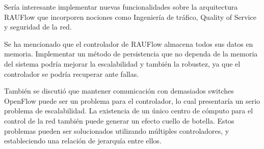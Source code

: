 Sería interesante implementar nuevas funcionalidades sobre la arquitectura RAUFlow que incorporen nociones como Ingeniería de tráfico, Quality of Service y seguridad de la red.

Se ha mencionado que el controlador de RAUFlow almacena todos sus datos en memoria. Implementar un método de persistencia que no dependa de la memoria del sistema podría mejorar la escalabilidad y también la robustez, ya que el controlador se podría recuperar ante fallas.

También se discutió que mantener comunicación con demasiados switches OpenFlow puede ser un problema para el controlador, lo cual presentaría un serio problema de escalabilidad. La existencia de un único centro de cómputo para el control de la red también puede generar un efecto cuello de botella. Estos problemas pueden ser solucionados utilizando múltiples controladores, y estableciendo una relación de jerarquía entre ellos.
